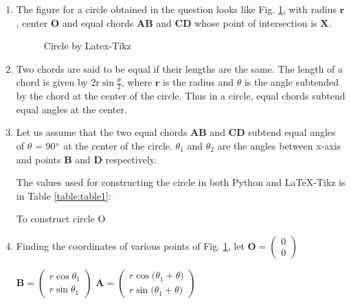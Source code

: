 \renewcommand{\vec}[1]{\mathbf{#1}}
\begin{enumerate}
\item
The figure for a circle obtained in the question looks like Fig. \ref{fig:stepthreetex}, with radius $\vec{r}$, center $\vec{O}$ and equal chords $\vec{AB}$ and $\vec{CD}$ whose point of intersection is $\vec{X}$.  
\begin{figure}[!ht]
\centering
\resizebox{\columnwidth}{!}{}
\caption{Circle by Latex-Tikz}
\label{fig:stepthreetex}	
\end{figure}

\item 
Two chords are said to be equal if their lengths are the same. The length of a chord is given by 2r$\sin{\frac{\theta}{2}}$, where $\vec{r}$ is the radius and  $\theta$ is the angle subtended by the chord at the center of the circle. Thus in a circle, equal chords subtend equal angles at the center.

\item Let us assume that the two equal chords $\vec{AB}$ and $\vec{CD}$ subtend equal angles of $\theta$ = 90$\degree$ at the center of the circle. $\theta_1$ and $\theta_2$ are the angles between x-axis and points $\vec{B}$ and $\vec{D}$ respectively.

The values used for constructing the circle in both Python and \LaTeX{}-Tikz is in Table \ref{table:table1}:\\
\begin{table}[ht]
    \begin{center}
    	
  \caption{To construct circle O}
   \label{table:table1}
   \end{center}	
\end{table}


\item Finding the coordinates of various points of Fig. \ref{fig:stepthreetex}, let 
\quad $ \vec{O}= \begin{pmatrix}0\\0\end{pmatrix}$

  \quad $ \vec{B}= \begin{pmatrix}r\cos{\theta _1}\\r\sin{\theta _1}\end{pmatrix}$
  \quad $\vec{A}=\begin{pmatrix}r\cos{\big(\theta _1 + \theta\big)}\\r\sin{\big(\theta _1 + \theta\big)}\end{pmatrix}$


\end{enumerate}
